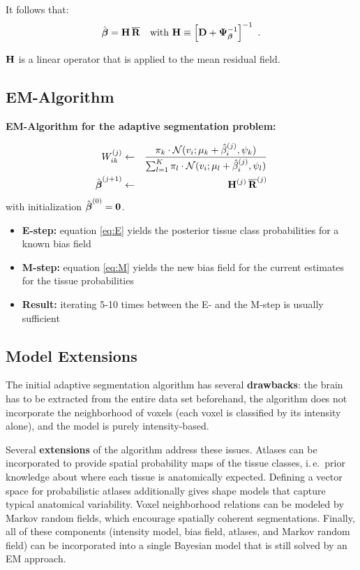   It follows that:
  {\small
  \begin{displaymath}
    \hat{\bm{\mathrm{\beta}}} = \mathbf{H} \, \overline{\bm{\mathrm{R}}} \quad \mbox{with}~ 
    \mathbf{H} \equiv \left[\mathbf{D} + \mathbf{\Psi}_{\bm{\mathrm{\beta}}}^{-1} \right]^{-1}~.
  \end{displaymath}
  }

  $\mathbf{H}$ is a linear operator that is applied to the mean residual field.
 
\subsection{EM-Algorithm}

\textbf{EM-Algorithm for the adaptive segmentation problem:}

  \begin{eqnarray}
    W_{ik}^{(j)}
    &\leftarrow& \frac{\pi_k \cdot \mathcal{N}(v_i ; \mu_k + \hat\beta_i^{(j)}, \psi_k)}
                      {\sum_{l=1}^K \pi_l \cdot \mathcal{N} (v_i ; \mu_l + \hat\beta_i^{(j)}, \psi_l)} \label{eq:E}    \\
    \hat{\bm{\mathrm{\beta}}}^{(j+1)}
    &\leftarrow& \mathbf{H}^{(j)} \, \overline{\bm{\mathrm{R}}}^{(j)} \label{eq:M}
  \end{eqnarray}
  with initialization $\hat{\bm{\mathrm{\beta}}}^{(0)}=\bm{\mathrm{0}}$.
 \begin{itemize}
    \item   \textbf{E-step:} equation \eqref{eq:E} yields the posterior tissue class probabilities for a known bias field   
    \item   \textbf{M-step:} equation \eqref{eq:M} yields the new bias field for the current estimates for the tissue probabilities  
    \item   \textbf{Result:} iterating 5-10 times between the E- and the M-step is usually sufficient
  \end{itemize}
 

\subsection{Model Extensions}\autocite{jaeger2009,pohl2005,pohl2007}
 The initial adaptive segmentation algorithm has several \textbf{drawbacks}: the brain has to be extracted from the entire data set beforehand, the algorithm does not incorporate the neighborhood of voxels (each voxel is classified by its intensity alone), and the model is purely intensity-based.

  Several \textbf{extensions} of the algorithm address these issues. Atlases can be incorporated to provide spatial probability maps of the tissue classes, i.\,e.\ prior knowledge about where each tissue is anatomically expected. Defining a vector space for probabilistic atlases additionally gives shape models that capture typical anatomical variability. Voxel neighborhood relations can be modeled by Markov random fields, which encourage spatially coherent segmentations. Finally, all of these components (intensity model, bias field, atlases, and Markov random field) can be incorporated into a single Bayesian model that is still solved by an EM approach.
 
